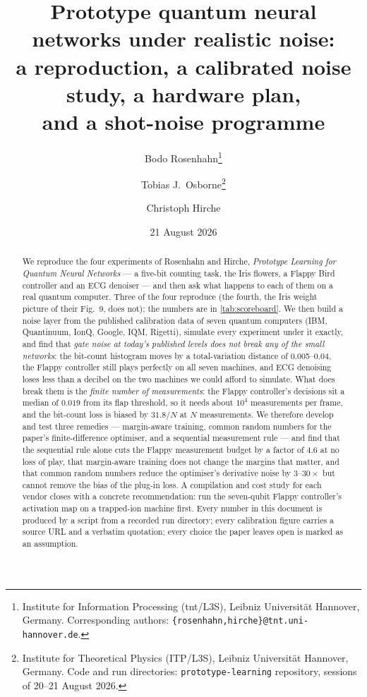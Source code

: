 \documentclass[11pt,a4paper]{article}
\title{Prototype quantum neural networks under realistic noise:\\
a reproduction, a calibrated noise study, a hardware plan,\\ and a shot-noise programme}
\author{Bodo Rosenhahn\thanks{Institute for Information Processing (tnt/L3S), Leibniz
Universit\"at Hannover, Germany.  Corresponding authors: \texttt{\{rosenhahn,hirche\}@tnt.uni-hannover.de}.}
\and Tobias J.~Osborne\thanks{Institute for Theoretical Physics (ITP/L3S), Leibniz Universit\"at
Hannover, Germany.  Code and run directories: \texttt{prototype-learning} repository, sessions of
20--21 August 2026.}
\and Christoph Hirche\footnotemark[1]}
\date{21 August 2026}
\begin{document}
\maketitle

\begin{abstract}
We reproduce the four experiments of Rosenhahn and Hirche, \emph{Prototype Learning for Quantum
Neural Networks} \cite{ptqnn} --- a five-bit counting task, the Iris flowers, a Flappy Bird
controller and an ECG denoiser --- and then ask what happens to each of them on a real quantum
computer.  Three of the four reproduce (the fourth, the Iris weight picture of their Fig.~9,
does not); the numbers are in \cref{tab:scoreboard}.  We then build a noise layer from the
published calibration data of seven quantum computers (IBM, Quantinuum, IonQ, Google, IQM,
Rigetti), simulate every experiment under it exactly, and find that \emph{gate noise at today's
published levels does not break any of the small networks}: the bit-count histogram moves by a
total-variation distance of \numrange{0.005}{0.04}, the Flappy controller still plays perfectly
on all seven machines, and ECG denoising loses less than a decibel on the two machines we could
afford to simulate.  What does break them is the \emph{finite number of measurements}: the
Flappy controller's decisions sit a median of $0.019$ from its flap threshold, so it needs about
$10^4$ measurements per frame, and the bit-count loss is biased by $31.8/N$ at $N$
measurements.  We therefore develop and test three remedies --- margin-aware training,
common random numbers for the paper's finite-difference optimiser, and a sequential
measurement rule --- and find that the sequential rule alone cuts the Flappy measurement
budget by a factor of $4.6$ at no loss of play, that margin-aware training does not change the
margins that matter, and that common random numbers reduce the optimiser's derivative noise by
$3$--$30\times$ but cannot remove the bias of the plug-in loss.  A compilation and cost
study for each vendor closes with a concrete recommendation: run the seven-qubit Flappy
controller's activation map on a trapped-ion machine first.  Every number in this document is
produced by a script from a recorded run directory; every calibration figure carries a source
URL and a verbatim quotation; every choice the paper leaves open is marked as an assumption.
\end{abstract}

\tableofcontents









\end{document}
